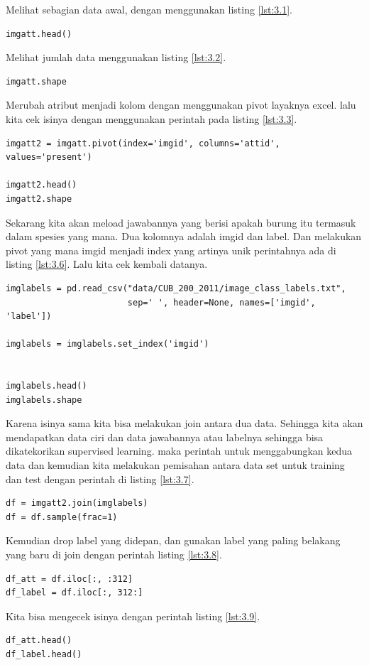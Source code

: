 Melihat sebagian data awal, dengan menggunakan listing \ref{lst:3.1}.

\begin{lstlisting}[caption=Melihat sebagian data awal,label={lst:3.1}]
imgatt.head()
\end{lstlisting}

Melihat jumlah data menggunakan listing \ref{lst:3.2}.
\begin{lstlisting}[caption=Mengetahui jumlah data,label={lst:3.2}]
imgatt.shape
\end{lstlisting}

Merubah atribut menjadi kolom dengan menggunakan pivot layaknya excel. lalu kita cek isinya dengan menggunakan perintah pada listing \ref{lst:3.3}.
\begin{lstlisting}[caption=Pivot dataset,label={lst:3.3}]
imgatt2 = imgatt.pivot(index='imgid', columns='attid', values='present')

imgatt2.head()
imgatt2.shape
\end{lstlisting}


Sekarang kita akan meload jawabannya yang berisi apakah burung itu termasuk dalam spesies yang mana. Dua kolomnya adalah imgid dan label. Dan melakukan pivot yang mana imgid menjadi index yang artinya unik perintahnya ada di listing \ref{lst:3.6}. Lalu kita cek kembali datanya.
\begin{lstlisting}[caption=membaca dataset label file txt,label={lst:3.6}]
imglabels = pd.read_csv("data/CUB_200_2011/image_class_labels.txt", 
                        sep=' ', header=None, names=['imgid', 'label'])

imglabels = imglabels.set_index('imgid')


imglabels.head()
imglabels.shape
\end{lstlisting}

Karena isinya sama kita bisa melakukan join antara dua data. Sehingga kita akan mendapatkan data ciri dan data jawabannya atau labelnya sehingga bisa dikatekorikan supervised learning. maka perintah untuk menggabungkan kedua data dan kemudian kita melakukan pemisahan antara data set untuk training dan test dengan perintah di listing \ref{lst:3.7}.
\begin{lstlisting}[caption=Menggabungkan field dari dua file terpisah,label={lst:3.7}]
df = imgatt2.join(imglabels)
df = df.sample(frac=1)
\end{lstlisting}

Kemudian drop label yang didepan, dan gunakan label yang paling belakang yang baru di join dengan perintah listing \ref{lst:3.8}.
\begin{lstlisting}[caption=Memisahkan dan memilih label,label={lst:3.8}]
df_att = df.iloc[:, :312]
df_label = df.iloc[:, 312:]
\end{lstlisting}
Kita bisa mengecek isinya dengan perintah listing \ref{lst:3.9}.
\begin{lstlisting}[caption=Melihat isi masing masing data frame,label={lst:3.9}]
df_att.head()
df_label.head()
\end{lstlisting}

